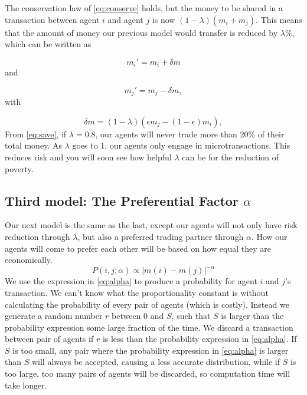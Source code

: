 \documentclass[12pt,a4paper]{article}
\begin{document}
The conservation law of \eqref{eq:conserve} holds, but the money to be shared in a transaction between
agent $i$ and agent $j$ is now $(1-\lambda)(m_i+m_j)$. This means that the amount of money our previous model would transfer is reduced by $\lambda$\%, which can be written as

\begin{equation}
  m_i'=m_i+\delta m
\end{equation}
and

\begin{equation}
  m_j'=m_j-\delta m,
\end{equation}
with

\begin{equation}\label{eq:save}
  \delta m=(1-\lambda)(\epsilon m_j-(1-\epsilon)m_i),
\end{equation}
From \eqref{eq:save}, if $\lambda = 0.8$, our agents will never trade more than 20\% of their total money.
As $\lambda$ goes to 1, our agents only engage in microtransactions. This reduces risk and you will soon see how helpful $\lambda$ can be for the reduction of poverty.

\subsection{Third model: The Preferential Factor $\alpha$} \label{sec:model3}
Our next model is the same as the last, except our agents will not only have risk reduction through $\lambda$, but also a preferred trading partner through $\alpha$.
How our agents will come to prefer each other will be based on how equal they are economically.
\begin{equation}\label{eq:alpha}
 P(i,j;\alpha) \propto \left|m(i)-m(j) \right|^{-\alpha}
\end{equation}
We use the expression in \eqref{eq:alpha} to produce a probability for agent $i$ and $j$'s transaction. We can't know what the proportionality constant is without
calculating the probability of every pair of agents (which is costly). Instead we generate a random number $r$ between $0$ and $S$, such that $S$ is larger than the probability expression
some large fraction of the time. We discard a transaction between pair of agents if $r$ is less than the probability expression in \eqref{eq:alpha}.
If $S$ is too small, any pair where the probability expression in \eqref{eq:alpha} is larger than $S$ will always be accepted, causing a less accurate distribution, while if $S$ is too large, too
many pairs of agents will be discarded, so computation time will take longer.
\end{document}
